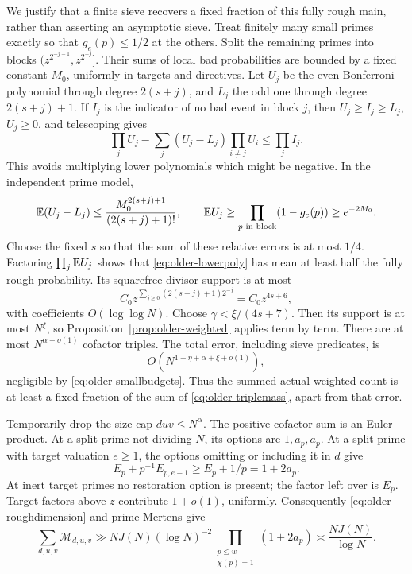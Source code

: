 We justify that a finite sieve recovers a fixed fraction of this
fully rough main, rather than asserting an asymptotic sieve.
Treat finitely many small primes exactly so that \(g_e(p)\le1/2\)
at the others.  Split the remaining primes into blocks
\((z^{2^{-j-1}},z^{2^{-j}}]\).
Their sums of local bad probabilities are bounded by a fixed
constant \(M_0\), uniformly in targets and directives.
Let \(U_j\) be the even Bonferroni polynomial through degree
\(2(s+j)\), and \(L_j\) the odd one through degree \(2(s+j)+1\).
If \(I_j\) is the indicator of no bad event in block \(j\), then
\(U_j\ge I_j\ge L_j\), \(U_j\ge0\), and telescoping gives
\begin{equation}\label{eq:older-lowerpoly}
 \prod_jU_j-\sum_j(U_j-L_j)\prod_{i\ne j}U_i
                                      \le\prod_jI_j .
\end{equation}
This avoids multiplying lower polynomials which might be negative.
In the independent prime model,
\[
 \mathbb E(U_j-L_j)\le\frac{M_0^{2(s+j)+1}}{(2(s+j)+1)!},
 \qquad \mathbb E U_j\ge\prod_{p\text{ in block}}(1-g_e(p))
                                             \ge e^{-2M_0}.
\]
Choose the fixed \(s\) so that the sum of these relative errors
is at most \(1/4\).
Factoring \(\prod_j\mathbb E U_j\) shows that
\eqref{eq:older-lowerpoly} has mean at least half the fully rough
probability.  Its squarefree divisor support is at most
\[
 C_0z^{\sum_{j\ge0}(2(s+j)+1)2^{-j}}
                               =C_0z^{4s+6},
\]
with coefficients \(O(\log\log N)\).
Choose \(\gamma<\xi/(4s+7)\).
Then its support is at most \(N^\xi\), so
Proposition~\ref{prop:older-weighted} applies term by term.
There are at most \(N^{\alpha+o(1)}\) cofactor triples.
The total error, including sieve predicates, is
\[
                  O(N^{1-\eta+\alpha+\xi+o(1)}),
\]
negligible by \eqref{eq:older-smallbudgets}.
Thus the summed actual weighted count is at least a fixed fraction
of the sum of \eqref{eq:older-triplemass}, apart from that error.

Temporarily drop the size cap \(duv\le N^\alpha\).
The positive cofactor sum is an Euler product.
At a split prime not dividing \(N\), its options are
\(1,a_p,a_p\).
At a split prime with target valuation \(e\ge1\), the options
omitting or including it in \(d\) give
\[
 E_p+p^{-1}E_{p,e-1}\ge E_p+1/p=1+2a_p.
\]
At inert target primes no restoration option is present; the
factor left over is \(E_p\).
Target factors above \(z\) contribute \(1+o(1)\), uniformly.
Consequently \eqref{eq:older-roughdimension} and prime Mertens give
\begin{equation}\label{eq:older-restoredmass}
 \sum_{d,u,v}\mathcal M_{d,u,v}
 \gg NJ(N)(\log N)^{-2}
          \prod_{\substack{p\le w\\\chi(p)=1}}(1+2a_p)
 \asymp \frac{NJ(N)}{\log N}.
\end{equation}

